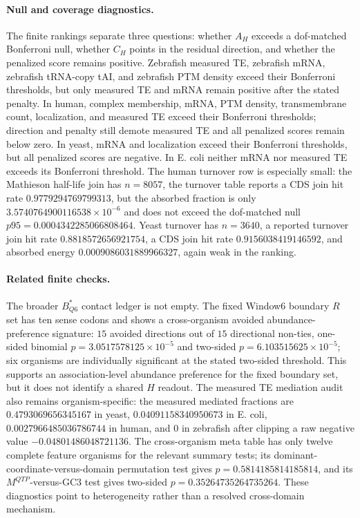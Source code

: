 \paragraph{Null and coverage diagnostics.}
The finite rankings separate three questions: whether $A_H$ exceeds a dof-matched Bonferroni null, whether $C_H$ points in the residual direction, and whether the penalized score remains positive.  Zebrafish measured TE, zebrafish mRNA, zebrafish tRNA-copy tAI, and zebrafish PTM density exceed their Bonferroni thresholds, but only measured TE and mRNA remain positive after the stated penalty.  In human, complex membership, mRNA, PTM density, transmembrane count, localization, and measured TE exceed their Bonferroni thresholds; direction and penalty still demote measured TE and all penalized scores remain below zero.  In yeast, mRNA and localization exceed their Bonferroni thresholds, but all penalized scores are negative.  In E. coli neither mRNA nor measured TE exceeds its Bonferroni threshold.  The human turnover row is especially small: the Mathieson half-life join has $n=8057$, the turnover table reports a CDS join hit rate $0.9779294769799313$, but the absorbed fraction is only $3.5740764900116538\times 10^{-6}$ and does not exceed the dof-matched null $p95=0.0004342285066808464$.  Yeast turnover has $n=3640$, a reported turnover join hit rate $0.8818572656921754$, a CDS join hit rate $0.9156038419146592$, and absorbed energy $0.0009086031889966327$, again weak in the ranking.

\paragraph{Related finite checks.}
The broader $B^*_{Q6}$ contact ledger is not empty.  The fixed Window6 boundary $R$ set has ten sense codons and shows a cross-organism avoided abundance-preference signature: $15$ avoided directions out of $15$ directional non-ties, one-sided binomial $p=3.0517578125\times 10^{-5}$ and two-sided $p=6.103515625\times 10^{-5}$; six organisms are individually significant at the stated two-sided threshold.  This supports an association-level abundance preference for the fixed boundary set, but it does not identify a shared $H$ readout.  The measured TE mediation audit also remains organism-specific: the measured mediated fractions are $0.4793069656345167$ in yeast, $0.04091158340950673$ in E. coli, $0.0027966485036786744$ in human, and $0$ in zebrafish after clipping a raw negative value $-0.04801486048721136$.  The cross-organism meta table has only twelve complete feature organisms for the relevant summary tests; its dominant-coordinate-versus-domain permutation test gives $p=0.5814185814185814$, and its $M^{QTP}$-versus-GC3 test gives two-sided $p=0.35264735264735264$.  These diagnostics point to heterogeneity rather than a resolved cross-domain mechanism.

